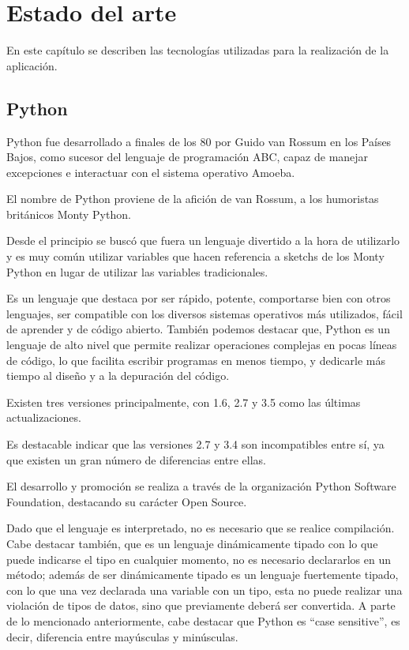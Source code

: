 \cleardoublepage
\chapter{Estado del arte}


En este capítulo se describen las tecnologías utilizadas para la realización de la aplicación.

\section{Python} 
\label{sec:python}


Python fue desarrollado a finales de los 80 por Guido van Rossum en los Países Bajos, como sucesor del lenguaje de programación ABC, capaz de manejar excepciones  e interactuar con el sistema operativo Amoeba.


El nombre de Python proviene de la afición de van Rossum, a los humoristas británicos Monty Python.


Desde el principio se buscó que fuera un lenguaje divertido a la hora de utilizarlo y es muy común utilizar variables que hacen referencia a sketchs de los Monty Python en lugar de utilizar las variables tradicionales.


Es un lenguaje que destaca por ser rápido, potente, comportarse bien con otros lenguajes, ser compatible con los diversos sistemas operativos más utilizados, fácil de aprender y de código abierto. También podemos destacar que, Python es un lenguaje de alto nivel que permite realizar operaciones complejas en pocas líneas de código, lo que facilita escribir programas en menos tiempo, y dedicarle más tiempo al diseño y a la depuración del código.


Existen tres versiones principalmente, con 1.6, 2.7 y 3.5 como las últimas actualizaciones. 


Es destacable indicar que las versiones 2.7 y 3.4 son incompatibles entre sí, ya que existen un gran número de diferencias entre ellas.


El desarrollo y promoción se realiza a través de la organización Python Software Foundation, destacando su carácter Open Source.


Dado que el lenguaje es interpretado, no es necesario que se realice compilación. Cabe destacar también, que es un lenguaje dinámicamente tipado con lo que puede indicarse el tipo en cualquier momento, no es necesario declararlos en un método; además de ser dinámicamente tipado es un lenguaje fuertemente tipado, con lo que una vez declarada una variable con un tipo, esta no puede realizar una violación de tipos de datos, sino que previamente deberá ser convertida. A parte de lo mencionado anteriormente, cabe destacar que Python es “case sensitive”, es decir, diferencia entre mayúsculas y minúsculas. 


